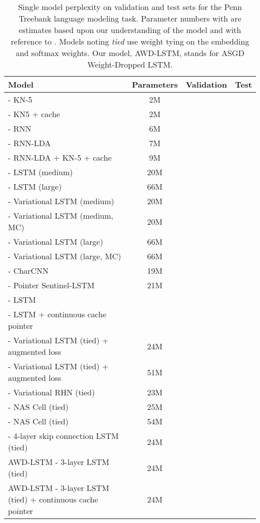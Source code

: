 \documentclass{article}
\begin{document}
\begin{table*}
\center
\begin{tabular}{l|ccc}
\toprule
\bf Model & \bf Parameters & \bf Validation &  \bf Test \\
\midrule
\citet{Mikolov2012} - KN-5 & 2M &  &  \\
\citet{Mikolov2012} - KN5 + cache & 2M &  &  \\
\citet{Mikolov2012} - RNN & 6M &  &  \\
\citet{Mikolov2012} - RNN-LDA & 7M &  &  \\
\citet{Mikolov2012} - RNN-LDA + KN-5 + cache & 9M &  &  \\
\citet{Zaremba2014} - LSTM (medium) & 20M &  &  \\
\citet{Zaremba2014} - LSTM (large) & 66M &  &  \\
\citet{Gal2016ATG} - Variational LSTM (medium) & 20M &  &  \\
\citet{Gal2016ATG} - Variational LSTM (medium, MC) & 20M &  &  \\
\citet{Gal2016ATG} - Variational LSTM (large) & 66M &  &  \\
\citet{Gal2016ATG} - Variational LSTM (large, MC) & 66M &  &  \\
\citet{Kim2016} - CharCNN & 19M &  &  \\
\citet{Merity2016} - Pointer Sentinel-LSTM & 21M &  &  \\
\citet{Grave2016} - LSTM &  &  &  \\
\citet{Grave2016} - LSTM + continuous cache pointer &  &  &  \\
\citet{Inan2016} - Variational LSTM (tied) + augmented loss & 24M &  &  \\
\citet{Inan2016} - Variational LSTM (tied) + augmented loss & 51M &  &  \\
\citet{Zilly2016} - Variational RHN (tied) & 23M &  &  \\
\citet{Zoph2016} - NAS Cell (tied) & 25M &  &  \\
\citet{Zoph2016} - NAS Cell (tied) & 54M &  &  \\
\citet{Melis2017} - 4-layer skip connection LSTM (tied) & 24M &  &  \\
\midrule
AWD-LSTM - 3-layer LSTM (tied) & 24M &  &  \\
\midrule
AWD-LSTM - 3-layer LSTM (tied) + continuous cache pointer & 24M &  &  \\
\bottomrule
\end{tabular}
\caption{
Single model perplexity on validation and test sets for the Penn Treebank language modeling task.
Parameter numbers with  are estimates based upon our understanding of the model and with reference to \citet{Merity2016}.
Models noting \textit{tied} use weight tying on the embedding and softmax weights.
Our model, AWD-LSTM, stands for ASGD Weight-Dropped LSTM.
}
\label{table:PTBresults}
\end{table*}
\end{document}
